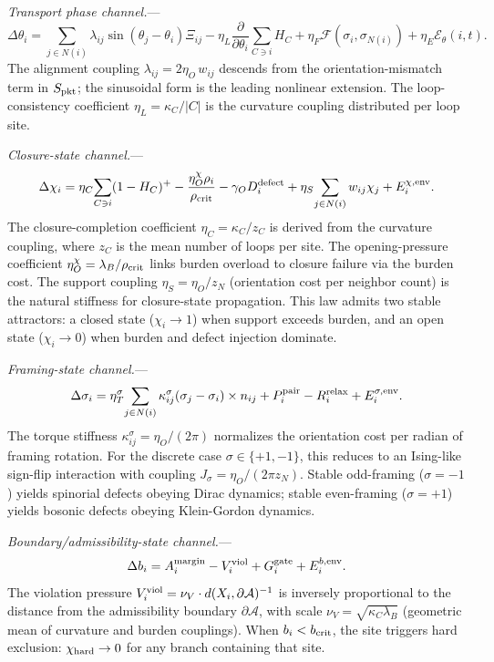 \documentclass[11pt,twocolumn]{article}
\begin{document}
\emph{Transport phase channel.}---
\begin{equation}
\label{eq:dtheta}
\Delta\theta_i = \sum_{j \in N(i)} \lambda_{ij}\sin(\theta_j - \theta_i)\Xi_{ij} - \eta_L\frac{\partial}{\partial\theta_i}\sum_{C\ni i} H_C + \eta_F\mathcal{F}(\sigma_i, \sigma_{N(i)}) + \eta_E\mathcal{E}_\theta(i,t).
\end{equation}
The alignment coupling $\lambda_{ij} = 2\eta_O\,w_{ij}$ descends from the orientation-mismatch term in $S_{\rm pkt}$; the sinusoidal form is the leading nonlinear extension.
The loop-consistency coefficient $\eta_L = \kappa_C / |C|$ is the curvature coupling distributed per loop site.

\emph{Closure-state channel.}---
\begin{equation}
\label{eq:dchi}
\Delta\chi_i = \eta_C\!\sum_{C\ni i}(1 - H_C)^+ - \frac{\eta_O^{\chi}\rho_i}{\rho_{\rm crit}} - \gamma_O D_i^{\rm defect} + \eta_S\!\sum_{j\in N(i)} w_{ij}\chi_j + E_i^{\chi,\rm env}.
\end{equation}
The closure-completion coefficient $\eta_C = \kappa_C / z_C$ is derived from the curvature coupling, where $z_C$ is the mean number of loops per site.
The opening-pressure coefficient $\eta_O^{\chi} = \lambda_B / \rho_{\rm crit}$ links burden overload to closure failure via the burden cost.
The support coupling $\eta_S = \eta_O / z_N$ (orientation cost per neighbor count) is the natural stiffness for closure-state propagation.
This law admits two stable attractors: a closed state ($\chi_i \to 1$) when support exceeds burden, and an open state ($\chi_i \to 0$) when burden and defect injection dominate.

\emph{Framing-state channel.}---
\begin{equation}
\label{eq:dsigma}
\Delta\sigma_i = \eta_T^{\sigma}\!\sum_{j\in N(i)}\kappa_{ij}^{\sigma}(\sigma_j - \sigma_i)\times n_{ij} + P_i^{\rm pair} - R_i^{\rm relax} + E_i^{\sigma,\rm env}.
\end{equation}
The torque stiffness $\kappa_{ij}^{\sigma} = \eta_O / (2\pi)$ normalizes the orientation cost per radian of framing rotation.
For the discrete case $\sigma \in \{+1, -1\}$, this reduces to an Ising-like sign-flip interaction with coupling $J_\sigma = \eta_O / (2\pi z_N)$.
Stable odd-framing ($\sigma = -1$) yields spinorial defects obeying Dirac dynamics; stable even-framing ($\sigma = +1$) yields bosonic defects obeying Klein-Gordon dynamics.

\emph{Boundary/admissibility-state channel.}---
\begin{equation}
\label{eq:db}
\Delta b_i = A_i^{\rm margin} - V_i^{\rm viol} + G_i^{\rm gate} + E_i^{b,\rm env}.
\end{equation}
The violation pressure $V_i^{\rm viol} = \nu_V \cdot d(X_i, \partial\mathcal{A})^{-1}$ is inversely proportional to the distance from the admissibility boundary $\partial\mathcal{A}$, with scale $\nu_V = \sqrt{\kappa_C \lambda_B}$ (geometric mean of curvature and burden couplings).
When $b_i < b_{\rm crit}$, the site triggers hard exclusion: $\chi_{\rm hard} \to 0$ for any branch containing that site.
\end{document}
